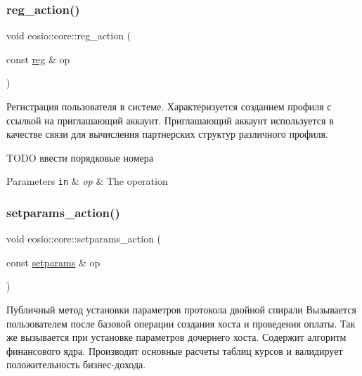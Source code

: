 \subsubsection{\texorpdfstring{reg\+\_\+action()}{reg\_action()}}
{\footnotesize\ttfamily void eosio\+::core\+::reg\+\_\+action (\begin{DoxyParamCaption}\item[{const \mbox{\hyperlink{structeosio_1_1reg}{reg}} \&}]{op }\end{DoxyParamCaption})\hspace{0.3cm}{\ttfamily [inline]}}



Регистрация пользователя в системе. Характеризуется созданием профиля с ссылкой на приглашающий аккаунт. Приглашающий аккаунт используется в качестве связи для вычисления партнерских структур различного профиля. 

T\+O\+DO ввести порядковые номера ~\newline
 
\begin{DoxyParams}[1]{Parameters}
\mbox{\tt in}  & {\em op} & The operation \\
\hline
\end{DoxyParams}
\mbox{\label{structeosio_1_1core_aeab146cbd52805b0e9689e32489d57d7}} 
\subsubsection{\texorpdfstring{setparams\+\_\+action()}{setparams\_action()}}
{\footnotesize\ttfamily void eosio\+::core\+::setparams\+\_\+action (\begin{DoxyParamCaption}\item[{const \mbox{\hyperlink{structeosio_1_1setparams}{setparams}} \&}]{op }\end{DoxyParamCaption})\hspace{0.3cm}{\ttfamily [inline]}}



Публичный метод установки параметров протокола двойной спирали Вызывается пользователем после базовой операции создания хоста и проведения оплаты. Так же вызывается при установке параметров дочернего хоста. Содержит алгоритм финансового ядра. Производит основные расчеты таблиц курсов и валидирует положительность бизнес-\/дохода. 


